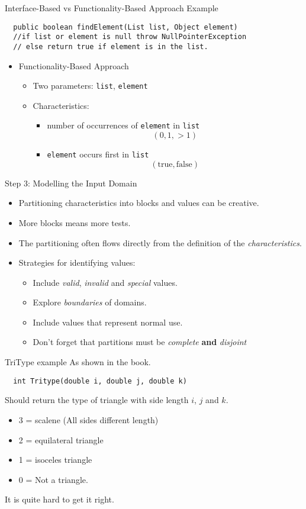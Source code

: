 \documentclass{beamer}
\begin{document}
\begin{frame}[fragile]
{Interface-Based vs Functionality-Based Approach Example}
\begin{verbatim}
  public boolean findElement(List list, Object element)
  //if list or element is null throw NullPointerException
  // else return true if element is in the list.
\end{verbatim}
\begin{itemize}
  \item Functionality-Based Approach
   \begin{itemize}
     \item Two parameters: {\tt list}, {\tt element}
     \item Characteristics:
      \begin{itemize}
        \item number of occurrences of {\tt element} in {\tt list}
          \[ (0,1,>1)\]
        \item {\tt element} occurs first in {\tt list}
        \[ (\mathrm{true},\mathrm{false}) \]
      \end{itemize}
    \end{itemize}
%
\end{itemize}
%
\end{frame}
\begin{frame}{Step 3: Modelling the Input Domain}
  \begin{itemize}
  \item Partitioning characteristics into blocks and values can be
    creative.
  \item More blocks means more tests.
  \item The partitioning often flows directly from the definition of
    the {\em characteristics}.
  \item Strategies for identifying values:
    \begin{itemize}
    \item Include {\em valid}, {\em invalid} and {\em special} values.
    \item Explore {\em boundaries} of domains.
    \item Include values that represent normal use.
    \item Don't forget that partitions must  be {\em complete} {\bf and} {\em disjoint}
    \end{itemize}
  \end{itemize}  
\end{frame}
\begin{frame}[fragile]{TriType example}
As shown in the book.
  \begin{lstlisting}
  int Tritype(double i, double j, double k)
  \end{lstlisting}
Should return  the type of triangle with side length $i$, $j$ and $k$.
  \begin{itemize}
  \item 3 = scalene (All sides different length)
  \item 2 = equilateral triangle
  \item 1 = isoceles triangle 
  \item 0 = Not a triangle.
  \end{itemize}
It is quite hard to get it right.
\end{frame}
\end{document}
